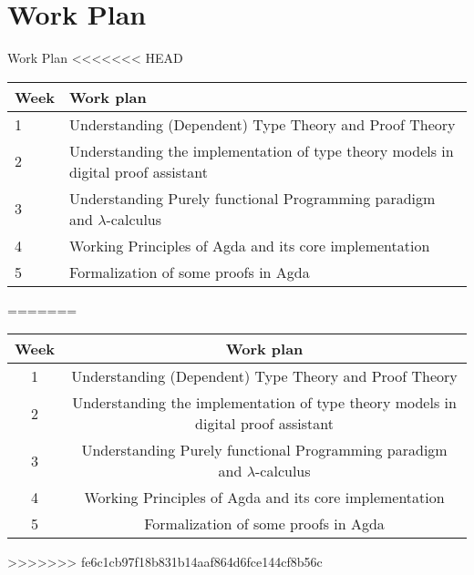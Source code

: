 \documentclass{beamer}
\begin{document}
\section{Work Plan}
\begin{frame}{Work Plan}
<<<<<<< HEAD
      \begin{tabular}{p{1cm} p{8cm} }
        \toprule
        Week & Work plan \\
        \toprule
         1 & Understanding (Dependent) Type Theory and Proof Theory\\
        \midrule
         2 & Understanding the implementation of type theory models in digital proof assistant \\
        \midrule
         3 & Understanding Purely functional Programming paradigm and $ \lambda $-calculus\\
        \midrule
         4 & Working Principles of Agda and its core implementation \\
        \midrule 
         5 & Formalization of some proofs in Agda \\
        \bottomrule


    \end{tabular}
=======
  \begin{center}
    \begin{tabular}{|c|c|}
        \hline
        Week & Work plan \\
        \hline
         1 & Understanding (Dependent) Type Theory and Proof Theory\\
        \hline
         2 & Understanding the implementation of type theory models in digital proof assistant \\
        \hline
         3 & Understanding Purely functional Programming paradigm and $ \lambda $-calculus\\
        \hline
         4 & Working Principles of Agda and its core implementation \\
        \hline 
         5 & Formalization of some proofs in Agda \\
        \hline


    \end{tabular}
\end{center}
>>>>>>> fe6c1cb97f18b831b14aaf864d6fce144cf8b56c
\end{frame}
\end{document}
